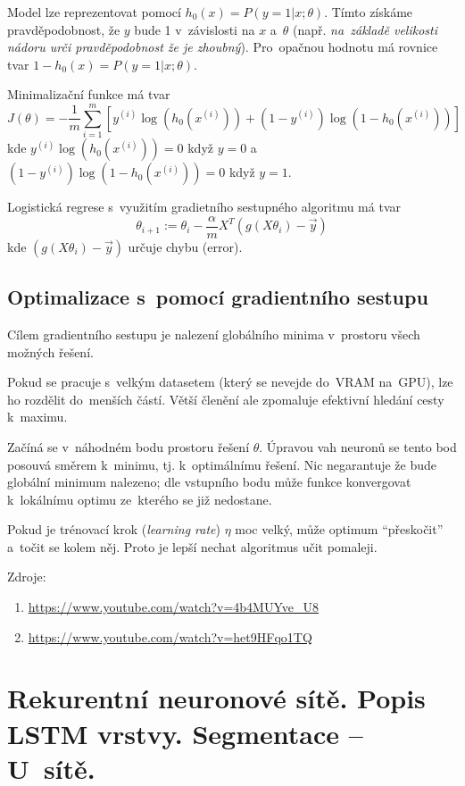 Model lze reprezentovat pomocí $h_0(x) = P(y = 1 | x ; \theta)$.
Tímto získáme pravděpodobnost, že $y$ bude 1 v~závislosti na $x$ a~$\theta$
(např. \emph{na~základě velikosti nádoru urči pravděpodobnost že je zhoubný}).
Pro~opačnou hodnotu má rovnice tvar $1 - h_0(x) = P(y = 1 | x ; \theta)$.

Minimalizační funkce má tvar
$$
    J(\theta) = -\frac{1}{m} \sum_{i=1}^{m} \left[ y^{(i)}\log(h_0(x^{(i)})) + (1-y^{(i)})\log(1 - h_0(x^{(i)})) \right]
$$
kde $y^{(i)}\log(h_0(x^{(i)})) = 0$ když $y = 0$ a~$(1-y^{(i)})\log(1 - h_0(x^{(i)})) = 0$ když $y = 1$.

Logistická regrese s~využitím gradietního sestupného algoritmu má tvar
$$
    \theta_{i+1} := \theta_i - \frac{\alpha}{m} X^T(g(X\theta_i) - \vec{y})
$$
kde $(g(X\theta_i) - \vec{y})$ určuje chybu (error).

\subsection{Optimalizace s~pomocí gradientního sestupu}

Cílem gradientního sestupu je nalezení globálního minima v~prostoru všech možných řešení.

Pokud se pracuje s~velkým datasetem (který se nevejde do~VRAM na~GPU), lze ho rozdělit do~menších částí.
Větší členění ale zpomaluje efektivní hledání cesty k~maximu.

Začíná se v~náhodném bodu prostoru řešení $\theta$.
Úpravou vah neuronů se tento bod posouvá směrem k~minimu, tj. k~optimálnímu řešení.
Nic negarantuje že bude globální minimum nalezeno; dle vstupního bodu může funkce konvergovat k~lokálnímu optimu ze~kterého se již nedostane.

Pokud je trénovací krok (\emph{learning rate}) $\eta$ moc velký, může optimum \enquote{přeskočit} a~točit se kolem něj. Proto je lepší nechat algoritmus učit pomaleji.

Zdroje:
\begin{enumerate}
    \item \url{https://www.youtube.com/watch?v=4b4MUYve_U8}
    \item \url{https://www.youtube.com/watch?v=het9HFqo1TQ}
\end{enumerate}

\clearpage
\section{Rekurentní neuronové sítě. Popis LSTM vrstvy. Segmentace -- U~sítě.}

